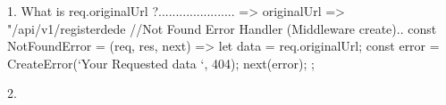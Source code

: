 1. What is req.originalUrl ?......................
   => originalUrl => "/api/v1/registerdede
//Not Found Error Handler (Middleware create)..
const NotFoundError = (req, res, next) => {
  let data = req.originalUrl;
  const error = CreateError(`Your Requested {data} `, 404);
  next(error);
};


2. 
